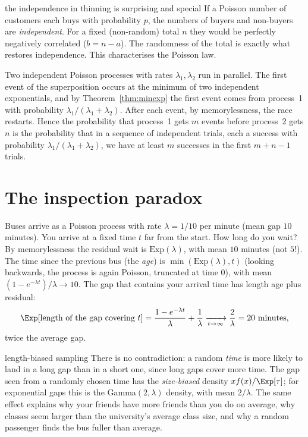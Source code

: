 \begin{nuance}{the independence in thinning is surprising and special}
If a Poisson number of customers each buys with probability $p$, the numbers of buyers and
non-buyers are \emph{independent}. For a fixed (non-random) total $n$ they would be
perfectly negatively correlated ($b=n-a$). The randomness of the total is exactly what
restores independence. This characterises the Poisson law.
\end{nuance}

\begin{example}\label{ex:race}
Two independent Poisson processes with rates $\lambda_1,\lambda_2$ run in parallel. The
first event of the superposition occurs at the minimum of two independent exponentials, and
by Theorem~\ref{thm:minexp} the first event comes from process~1 with probability
$\lambda_1/(\lambda_1+\lambda_2)$. After each event, by memorylessness, the race restarts.
Hence the probability that process~1 gets $m$ events before process~2 gets $n$ is the
probability that in a sequence of independent trials, each a success with probability
$\lambda_1/(\lambda_1+\lambda_2)$, we have at least $m$ successes in the first $m+n-1$
trials.
\end{example}

\section{The inspection paradox}

\begin{example}\label{ex:inspection}
Buses arrive as a Poisson process with rate $\lambda=1/10$ per minute (mean gap $10$
minutes). You arrive at a fixed time $t$ far from the start. How long do you wait? By
memorylessness the residual wait is $\mathrm{Exp}(\lambda)$, with mean $10$ minutes
(not $5$!). The time since the previous bus (the \emph{age}) is $\min(\mathrm{Exp}(\lambda),t)$
(looking backwards, the process is again Poisson, truncated at time $0$), with mean
$(1-e^{-\lambda t})/\lambda\to10$. The gap that contains your arrival time has length
age plus residual:
\[
\Exp[\text{length of the gap covering }t]=\frac{1-e^{-\lambda t}}\lambda+\frac1\lambda\xrightarrow[t\to\infty]{}\frac2\lambda=20\text{ minutes},
\]
twice the average gap.
\end{example}

\begin{nuance}{length-biased sampling}
There is no contradiction: a random \emph{time} is more likely to land in a long gap than
in a short one, since long gaps cover more time. The gap seen from a randomly chosen time
has the \emph{size-biased} density $xf(x)/\Exp[\tau]$; for exponential gaps this is the
Gamma$(2,\lambda)$ density, with mean $2/\lambda$. The same effect explains why your friends
have more friends than you do on average, why classes seem larger than the university's
average class size, and why a random passenger finds the bus fuller than average.
\end{nuance}

